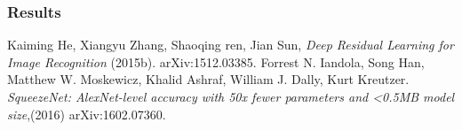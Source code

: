 \documentclass[11pt]{article}
\begin{document}
\subsubsection{Results}



\begin{thebibliography}{10}
	
Kaiming He, Xiangyu Zhang, Shaoqing ren, Jian Sun, \textit{Deep Residual Learning for Image Recognition}  
 (2015b). arXiv:1512.03385.
Forrest N. Iandola, Song Han, Matthew W. Moskewicz, Khalid Ashraf, William J. Dally, Kurt Kreutzer. \textit{SqueezeNet: AlexNet-level accuracy with 50x fewer parameters and <0.5MB model size},(2016) arXiv:1602.07360.
\end{thebibliography}
\end{document}
